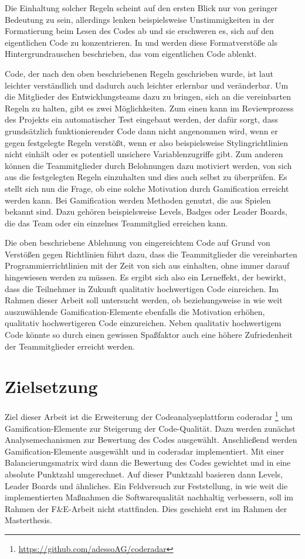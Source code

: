 \documentclass[
	oneside,  %
	ngerman, 
	final, 
	11pt, 
	a4paper, 
	1.1headlines, 
	headinclude=false, 
	footinclude=false, 
	mpinclude=false, 
	pagesize, 
	onecolumn, 
	titlepage, 
	parskip=half, 
	headsepline, 
	chapterprefix=false, 
	version=first, 
	listof=totoc, 
	bibliography=totoc, 
	toc=graduated, 
	fleqn
]{scrbook}
\begin{document}
Die Einhaltung solcher Regeln scheint auf den ersten Blick nur von geringer Bedeutung zu sein, allerdings lenken beispielsweise Unstimmigkeiten in der Formatierung beim Lesen des Codes ab und sie erschweren es, sich auf den eigentlichen Code zu konzentrieren.
In \cite{PJ2015} und \cite{SP2011} werden diese Formatverstöße als Hintergrundrauschen beschrieben, das vom eigentlichen Code ablenkt. 

Code, der nach den oben beschriebenen Regeln geschrieben wurde, ist laut \cite{PJ2015} leichter verständlich und dadurch auch leichter erlernbar und veränderbar.
Um die Mitglieder des Entwicklungsteams dazu zu bringen, sich an die vereinbarten Regeln zu halten, gibt es zwei Möglichkeiten.
Zum einen kann im Reviewprozess des Projekts ein automatischer Test eingebaut werden, der dafür sorgt, dass grundsätzlich funktionierender Code dann nicht angenommen wird, wenn er gegen festgelegte Regeln verstößt, wenn er also beispielsweise Stylingrichtlinien nicht einhält oder es potentiell unsichere Variablenzugriffe gibt.
Zum anderen können die Teammitglieder durch Belohnungen dazu motiviert werden, von sich aus die festgelegten Regeln einzuhalten und dies auch selbst zu überprüfen. 
Es stellt sich nun die Frage, ob eine solche Motivation durch Gamification erreicht werden kann.
Bei Gamification werden Methoden genutzt, die aus Spielen bekannt sind.
Dazu gehören beispielsweise Levels, Badges oder Leader Boards, die das Team oder ein einzelnes Teammitglied erreichen kann. 

Die oben beschriebene Ablehnung von eingereichtem Code auf Grund von Verstößen gegen Richtlinien führt dazu, dass die Teammitglieder die vereinbarten Programmierrichtlinien mit der Zeit von sich aus einhalten, ohne immer darauf hingewiesen werden zu müssen.
Es ergibt sich also ein Lerneffekt, der bewirkt, dass die Teilnehmer in Zukunft qualitativ hochwertigen Code einreichen.
Im Rahmen dieser Arbeit soll untersucht werden, ob beziehungsweise in wie weit auszuwählende Gamification-Elemente ebenfalls die Motivation erhöhen, qualitativ hochwertigeren Code einzureichen.
Neben qualitativ hochwertigem Code könnte so durch einen gewissen \glqq Spaßfaktor\grqq{} auch eine höhere Zufriedenheit der Teammitglieder erreicht werden.
		
\section{Zielsetzung}
\label{Zielsetzung}
Ziel dieser Arbeit ist die Erweiterung der Codeanalyseplattform coderadar \footnote{\url{https://github.com/adessoAG/coderadar}} um Gamification-Elemente zur Steigerung der Code-Qualität.
Dazu werden zunächst Analysemechanismen zur Bewertung des Codes ausgewählt.
Anschließend werden Gamification-Elemente ausgewählt und in coderadar implementiert.
Mit einer Balancierungsmatrix wird dann die Bewertung des Codes gewichtet und in eine absolute Punktzahl umgerechnet.
Auf dieser Punktzahl basieren dann Levels, Leader Boards und ähnliches.
Ein Feldversuch zur Feststellung, in wie weit die implementierten Maßnahmen die Softwarequalität nachhaltig verbessern, soll im Rahmen der F\&E-Arbeit nicht stattfinden.
Dies geschieht erst im Rahmen der Masterthesis.
		
\end{document}
